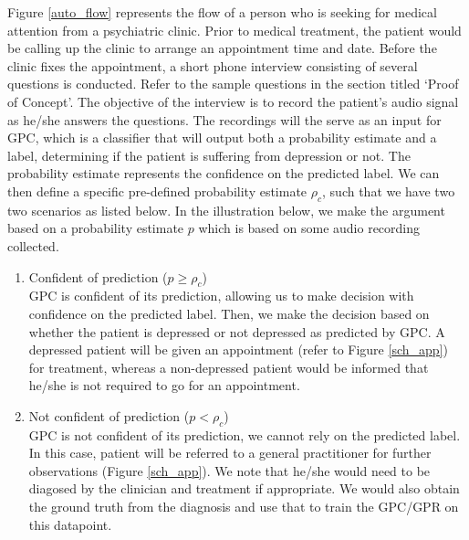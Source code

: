 \documentclass{article}
\begin{document}
	Figure \ref{auto_flow} represents the flow of a person who is seeking for medical attention from a psychiatric clinic.
	Prior to medical treatment, the patient would be calling up the clinic to arrange an appointment time and date. 
	Before the clinic fixes the appointment, a short phone interview consisting of several questions is conducted.
	Refer to the sample questions in the section titled `Proof of Concept'.
	The objective of the interview is to record the patient's audio signal as he/she answers the questions.
	The recordings will the serve as an input for GPC, which is a classifier that will output both a probability estimate and a label, determining if the patient is suffering from depression or not.
	The probability estimate represents the confidence on the predicted label. 
	We can then define a specific pre-defined probability estimate $\rho_c$, such that we have two two scenarios as listed below. 
	In the illustration below, we make the argument based on a probability estimate $p$ which is based on some audio recording collected.
	
	\begin{enumerate}
		\item {Confident of prediction ($p \geq \rho_c$)} \\
		GPC is confident of its prediction, allowing us to make decision with confidence on the predicted label.
		Then, we make the decision based on whether the patient is depressed or not depressed as predicted by GPC. 
		A depressed patient will be given an appointment (refer to Figure \ref{sch_app}) for treatment, whereas a non-depressed patient would be informed that he/she is not required to go for an appointment.
		\item {Not confident of prediction ($p < \rho_c$}) \\
		GPC is not confident of its prediction, we cannot rely on the predicted label. 
		In this case, patient will be referred to a general practitioner for further observations (Figure \ref{sch_app}). 
		We note that he/she would need to be diagosed by the clinician and treatment if appropriate. 
		We would also obtain the ground truth from the diagnosis and use that to train the GPC/GPR on this datapoint. 
	\end{enumerate}
	
\end{document}
